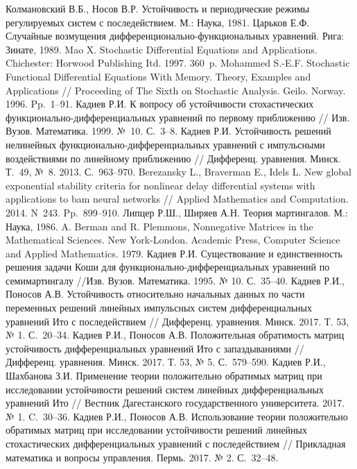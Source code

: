 \begin{thebibliography}{1}
Колмановский В.Б., Носов В.Р. Устойчивость и периодические режимы регулируемых систем с последействием. М.: Наука, 1981.
 Царьков Е.Ф. Случайные возмущения дифференционально-функциональных уравнений. Рига: Зинате, 1989.
 Mao X. Stochastic Differential  Equations and Applications. Chichester: Horwood Publishing Itd. 1997. 360~p.
 Mohammed S.-E.F. Stochastic Functional Differential Equations With Memory. Theory, Examples and Applications // Proceeding of The
Sixth on Stochastic Analysis. Geilo.  Norway. 1996. Pp.~1--91.
 Кадиев Р.И. К вопросу об устойчивости стохастических
функционально-диффе\-ренциальных уравнений по первому приближению
// Изв. Вузов. Математика. 1999. №~10. С.~3--8.
 Кадиев Р.И. Устойчивость решений нелинейных
функционально-дифференциаль\-ных уравнений с импульсными
воздействиями по линейному приближению // Дифференц. уравнения.
Минск. Т.~49, №~8. 2013. С.~963--970.
 Berezansky L., Braverman E., Idels L. New global exponential
stability criteria for nonlinear delay differential systems with
applications to bam neural networks // Applied Mathematics and Computation. 2014. N~243.  Pp.~899--910.
 Липцер Р.Ш., Ширяев А.Н. Теория мартингалов. М.: Наука, 1986.
 A. Berman and R. Plemmons, Nonnegative Matrices in the
Mathematical Sciences. New York-London. Academic Press, Computer Science and Applied Mathematics. 1979.
Кадиев Р.И. Существование и единственность решения задачи Коши
для функци\-онально-дифференциальных уравнений по семимартингалу
//Изв. Вузов. Математика. 1995. № 10. С.~35--40.
 Кадиев Р.И., Поносов А.В. Устойчивость относительно начальных
данных по части переменных решений линейных импульсных систем
дифференциальных уравнений  Ито с последействием // Дифференц. уравнения. Минск. 2017.
Т. 53, № 1. С.~20--34.
Кадиев Р.И., Поносов А.В. Положительная обратимость матриц
устойчивость дифференциальных уравнений Ито с запаздываниями // Дифференц. уравнения. Минск. 2017. Т. 53, № 5. С.~579--590.
Кадиев Р.И., Шахбанова З.И. Применение теории положительно
обратимых матриц  при исследовании устойчивости решений систем
линейных дифференциальных  уравнений Ито  // Вестник Дагестанского
государственного университета. 2017.  № 1. C.~30--36.
 Кадиев Р.И., Поносов А.В. Использование теории положительно обратимых матриц при исследовании устойчивости решений линейных стохастических дифференциальных уравнений с последействием // Прикладная математика и вопросы управления. Пермь. 2017. № 2. С.~32--48.


\end{thebibliography}
